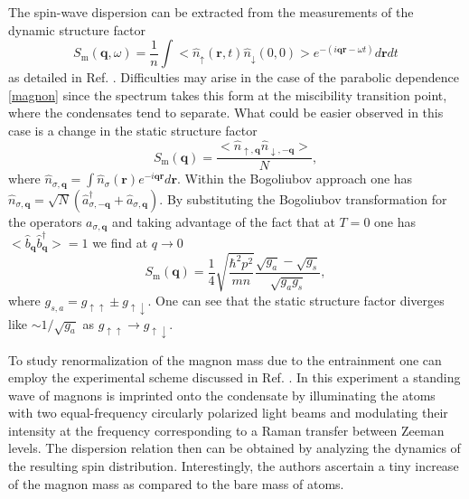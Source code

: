 \documentclass[reprint,superscriptaddress,showpacs,nofootinbib,aps,pra]{revtex4-1}
\begin{document}
The spin-wave dispersion can be extracted from the measurements of the dynamic structure factor
\begin{equation}
S_\mathrm{m}(\bm q,\omega)=\frac{1}{n}\int <\hat n_\uparrow (\bm r,t)\hat n_\downarrow(0,0)>e^{-(i\bm q\bm r-\omega t)}d\bm r dt
\end{equation}
as detailed in Ref. \cite{Carusotto}. Difficulties may arise in the case of the parabolic dependence \eqref{magnon} since the spectrum takes this form at the miscibility transition point, where the condensates tend to separate. What could be easier observed in this case is a change in the  static structure factor
\begin{equation}
S_\mathrm{m}(\bm q)=\frac{<\hat n_{\uparrow,\bm q}\hat n_{\downarrow,-\bm q}>}{N},
\end{equation}
where $\hat n_{\sigma,\bm q}=\int \hat n_\sigma(\bm r) e^{-i\bm q\bm r}d\bm r$. Within the Bogoliubov approach one has $\hat n_{\sigma,\bm q}=\sqrt{N}(\hat a_{\sigma,-\bm q}^\dagger+\hat a_{\sigma,\bm q})$. By substituting the Bogoliubov transformation for the operators $a_{\sigma,\bm q}$ and taking advantage of the fact that at $T=0$ one has $<\hat b_{\bm q}\hat b_{\bm q}^\dagger>=1$ we find at $q\rightarrow 0$
\begin{equation}
S_\mathrm{m}(\bm q)=\frac{1}{4}\sqrt{\frac{\hbar^2 p^2}{mn}}\frac{\sqrt{g_a}-\sqrt{g_s}}{\sqrt{g_a g_s}},
\end{equation}
where $g_{s,a}=g_{\uparrow\uparrow}\pm g_{\uparrow\downarrow}$. One can see that the static structure factor diverges like $\sim 1/\sqrt{g_a}$ as $g_{\uparrow\uparrow}\rightarrow g_{\uparrow\downarrow}$.

To study renormalization of the magnon mass due to the entrainment one can employ the experimental scheme discussed in Ref. \cite{Marti}. In this experiment a standing wave of magnons is imprinted onto the condensate by illuminating the atoms with two equal-frequency circularly polarized light beams and modulating their intensity at the frequency corresponding to a Raman transfer between Zeeman levels. The dispersion relation then can be obtained by analyzing the dynamics of the resulting spin distribution. Interestingly, the authors ascertain a tiny increase of the magnon mass as compared to the bare mass of atoms.              
\end{document}
